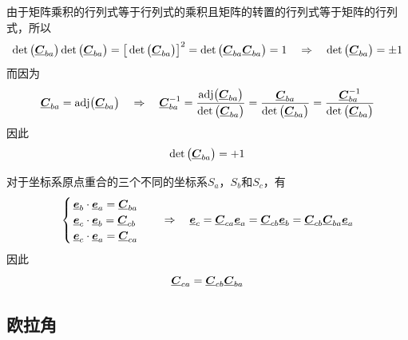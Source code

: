 \vspace*{0.5em}
\sssection[坐标变换矩阵的行列式为1]

由于矩阵乘积的行列式等于行列式的乘积且矩阵的转置的行列式等于矩阵的行列式，所以
\begin{equation}
	\det \big(\underline{\bm{C}}_{ba}\big) \det \big(\underline{\bm{C}}_{ba}\big) 
	= \big[ \det \big(\underline{\bm{C}}_{ba} \big) \big]^2 
	= \det \big( \underline{\bm{C}}_{ba} \underline{\bm{C}}_{ba} \big) 
	= 1
	\quad \Rightarrow \quad 
	\det \big(\underline{\bm{C}}_{ba}\big) = \pm 1
\end{equation}
而因为
\begin{equation*}
	\underline{\bm{C}}_{ba} = \text{adj}\big( \underline{\bm{C}}_{ba} \big) 
	\quad  \Rightarrow \quad 
	\underline{\bm{C}}_{ba}^{-1} 
	= \dfrac{\text{adj}\big( \underline{\bm{C}}_{ba} \big)}{\det \big( \underline{\bm{C}}_{ba} \big)} 
	= \dfrac{\underline{\bm{C}}_{ba}}{\det \big( \underline{\bm{C}}_{ba} \big)} 
	= \dfrac{\underline{\bm{C}}_{ba}^{-1}}{\det \big( \underline{\bm{C}}_{ba} \big)}
\end{equation*}
因此
\begin{equation}
	\det \big( \underline{\bm{C}}_{ba} \big) = + 1
\end{equation}
\vspace*{0.5em}


\sssection[相继运动的坐标变换矩阵]

对于坐标系原点重合的三个不同的坐标系$S_a$，$S_b$和$S_c$，有
\begin{equation*}
	\begin{cases}
		\, \underline{\bm{e}}_b \cdot \underline{\bm{e}}_a = \underline{\bm{C}}_{ba} \\
		\, \underline{\bm{e}}_c \cdot \underline{\bm{e}}_b = \underline{\bm{C}}_{cb} \\
		\, \underline{\bm{e}}_c \cdot \underline{\bm{e}}_a = \underline{\bm{C}}_{ca}
	\end{cases}
	\quad \Rightarrow \quad 
	\underline{\bm{e}}_c = \underline{\bm{C}}_{ca} \underline{\bm{e}}_a = \underline{\bm{C}}_{cb}\underline{\bm{e}}_b = \underline{\bm{C}}_{cb} \underline{\bm{C}}_{ba} \underline{\bm{e}}_{a}
\end{equation*}
因此
\begin{equation}
	\underline{\bm{C}}_{ca} = \underline{\bm{C}}_{cb} \underline{\bm{C}}_{ba}
\end{equation}



\subsection{欧拉角}
\vspace*{-1em}

